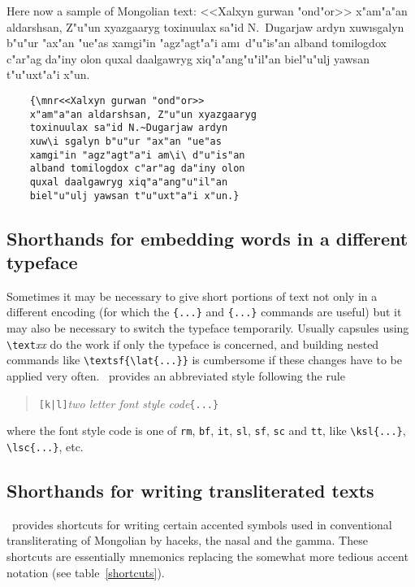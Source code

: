 \documentclass[11pt,a4paper]{article}
\begin{document}
Here now a sample of Mongolian text:
\exa
	{\mnr<<Xalxyn gurwan "ond"or>> 
	x"am"a"an aldarshsan, Z"u"un xyazgaaryg
	toxinuulax sa"id N.~Dugarjaw ardyn
	xuw\i sgalyn b"u"ur "ax"an "ue"as
	xamgi"in "agz"agt"a"i am\i\ d"u"is"an
	alband tomilogdox c"ar"ag da"iny olon
	quxal daalgawryg xiq"a"ang"u"il"an
	biel"u"ulj yawsan t"u"uxt"a"i x"un.}
\exb
\begin{verbatim}
	{\mnr<<Xalxyn gurwan "ond"or>> 
	x"am"a"an aldarshsan, Z"u"un xyazgaaryg
	toxinuulax sa"id N.~Dugarjaw ardyn
	xuw\i sgalyn b"u"ur "ax"an "ue"as
	xamgi"in "agz"agt"a"i am\i\ d"u"is"an
	alband tomilogdox c"ar"ag da"iny olon
	quxal daalgawryg xiq"a"ang"u"il"an
	biel"u"ulj yawsan t"u"uxt"a"i x"un.}
\end{verbatim}
\exc

\subsection{Shorthands for embedding words in a different
		typeface}\label{typefacecapsules}

Sometimes it may be necessary to give short portions of text not
only in a different encoding (for which the \verb:{...}:
and \verb:{...}: commands are
useful) but it may also be necessary to switch the typeface
temporarily. Usually capsules using \verb'\text'\emph{xx} do the
work if only the typeface is concerned, and building nested commands
like \verb'\textsf{\lat{...}}' is cumbersome if these changes have
to be applied very often. \MonTeX\ provides an abbreviated style
following the rule 
\begin{quote}
	\texttt{[k|l]}\emph{two letter font style code}\verb'{...}'
\end{quote}
where the font style code is one of
	\verb'rm',
	\verb'bf',
	\verb'it',
	\verb'sl',
	\verb'sf',
	\verb'sc' and
	\verb'tt',
like \verb'\ksl{...}', \verb'\lsc{...}', etc.


\subsection{Shorthands for writing transliterated texts}

\MonTeX\ provides shortcuts for writing certain accented symbols
used in conventional transliterating of Mongolian by 
haceks, the nasal and the gamma. These shortcuts are essentially
mnemonics replacing the somewhat more tedious accent notation (see
table~\ref{shortcuts}).
\end{document}
